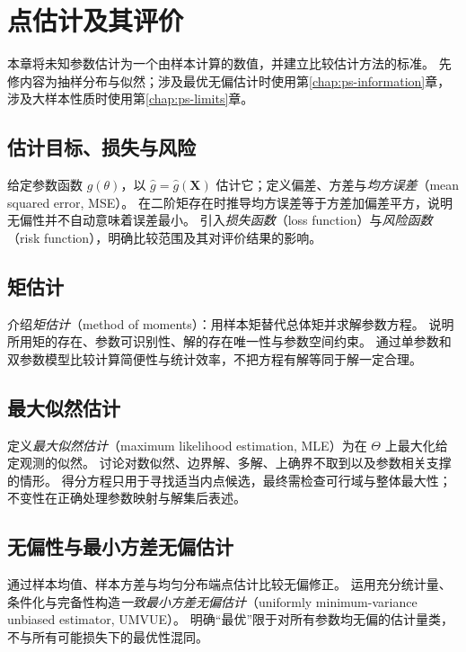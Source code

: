 \setcounter{chapter}{11} %
\chapter{点估计及其评价}
\label{chap:ps-point-estimation}

本章将未知参数估计为一个由样本计算的数值，并建立比较估计方法的标准。
先修内容为抽样分布与似然；涉及最优无偏估计时使用第\ref{chap:ps-information}章，涉及大样本性质时使用第\ref{chap:ps-limits}章。

\section{估计目标、损失与风险}
\label{sec:ps-estimation-criteria}
给定参数函数 $g(\theta)$，以 $\widehat g=\widehat g(\mathbf X)$ 估计它；定义偏差、方差与\emph{均方误差}（mean squared error, MSE）。
在二阶矩存在时推导均方误差等于方差加偏差平方，说明无偏性并不自动意味着误差最小。
引入\emph{损失函数}（loss function）与\emph{风险函数}（risk function），明确比较范围及其对评价结果的影响。

\section{矩估计}
\label{sec:ps-method-moments}
介绍\emph{矩估计}（method of moments）：用样本矩替代总体矩并求解参数方程。
说明所用矩的存在、参数可识别性、解的存在唯一性与参数空间约束。
通过单参数和双参数模型比较计算简便性与统计效率，不把方程有解等同于解一定合理。

\section{最大似然估计}
\label{sec:ps-maximum-likelihood}
定义\emph{最大似然估计}（maximum likelihood estimation, MLE）为在 $\Theta$ 上最大化给定观测的似然。
讨论对数似然、边界解、多解、上确界不取到以及参数相关支撑的情形。
得分方程只用于寻找适当内点候选，最终需检查可行域与整体最大性；不变性在正确处理参数映射与解集后表述。

\section{无偏性与最小方差无偏估计}
\label{sec:ps-unbiased-estimation}
通过样本均值、样本方差与均匀分布端点估计比较无偏修正。
运用充分统计量、条件化与完备性构造\emph{一致最小方差无偏估计}（uniformly minimum-variance unbiased estimator, UMVUE）。
明确“最优”限于对所有参数均无偏的估计量类，不与所有可能损失下的最优性混同。

